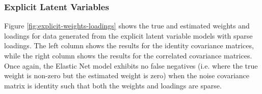 \subsubsection{Explicit Latent Variables}

Figure \ref{fig:explicit-weights-loadings} shows the true and estimated weights and \gls{loadings} for data generated from the explicit latent variable models with sparse \gls{loadings}.
The left column shows the results for the identity covariance matrices, while the right column shows the results for the correlated covariance matrices.
Once again, the Elastic Net model exhibits no false negatives (i.e. where the true weight is non-zero but the estimated weight is zero) when the noise covariance matrix is identity such that both the weights and \gls{loadings} are sparse.


\begin{figure}
\centering
\begin{subfigure}{0.49\linewidth}
\centering

\end{subfigure}
\end{figure}
